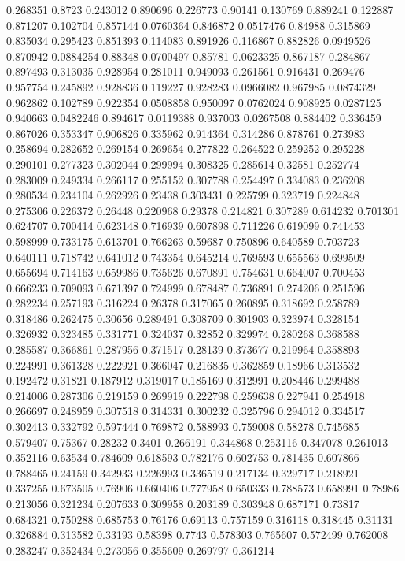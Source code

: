 0.268351 0.8723
0.243012 0.890696
0.226773 0.90141
0.130769 0.889241
0.122887 0.871207
0.102704 0.857144
0.0760364 0.846872
0.0517476 0.84988
0.315869 0.835034
0.295423 0.851393
0.114083 0.891926
0.116867 0.882826
0.0949526 0.870942
0.0884254 0.88348
0.0700497 0.85781
0.0623325 0.867187
0.284867 0.897493
0.313035 0.928954
0.281011 0.949093
0.261561 0.916431
0.269476 0.957754
0.245892 0.928836
0.119227 0.928283
0.0966082 0.967985
0.0874329 0.962862
0.102789 0.922354
0.0508858 0.950097
0.0762024 0.908925
0.0287125 0.940663
0.0482246 0.894617
0.0119388 0.937003
0.0267508 0.884402
0.336459 0.867026
0.353347 0.906826
0.335962 0.914364
0.314286 0.878761
0.273983 0.258694
0.282652 0.269154
0.269654 0.277822
0.264522 0.259252
0.295228 0.290101
0.277323 0.302044
0.299994 0.308325
0.285614 0.32581
0.252774 0.283009
0.249334 0.266117
0.255152 0.307788
0.254497 0.334083
0.236208 0.280534
0.234104 0.262926
0.23438 0.303431
0.225799 0.323719
0.224848 0.275306
0.226372 0.26448
0.220968 0.29378
0.214821 0.307289
0.614232 0.701301
0.624707 0.700414
0.623148 0.716939
0.607898 0.711226
0.619099 0.741453
0.598999 0.733175
0.613701 0.766263
0.59687 0.750896
0.640589 0.703723
0.640111 0.718742
0.641012 0.743354
0.645214 0.769593
0.655563 0.699509
0.655694 0.714163
0.659986 0.735626
0.670891 0.754631
0.664007 0.700453
0.666233 0.709093
0.671397 0.724999
0.678487 0.736891
0.274206 0.251596
0.282234 0.257193
0.316224 0.26378
0.317065 0.260895
0.318692 0.258789
0.318486 0.262475
0.30656 0.289491
0.308709 0.301903
0.323974 0.328154
0.326932 0.323485
0.331771 0.324037
0.32852 0.329974
0.280268 0.368588
0.285587 0.366861
0.287956 0.371517
0.28139 0.373677
0.219964 0.358893
0.224991 0.361328
0.222921 0.366047
0.216835 0.362859
0.18966 0.313532
0.192472 0.31821
0.187912 0.319017
0.185169 0.312991
0.208446 0.299488
0.214006 0.287306
0.219159 0.269919
0.222798 0.259638
0.227941 0.254918
0.266697 0.248959
0.307518 0.314331
0.300232 0.325796
0.294012 0.334517
0.302413 0.332792
0.597444 0.769872
0.588993 0.759008
0.58278 0.745685
0.579407 0.75367
0.28232 0.3401
0.266191 0.344868
0.253116 0.347078
0.261013 0.352116
0.63534 0.784609
0.618593 0.782176
0.602753 0.781435
0.607866 0.788465
0.24159 0.342933
0.226993 0.336519
0.217134 0.329717
0.218921 0.337255
0.673505 0.76906
0.660406 0.777958
0.650333 0.788573
0.658991 0.78986
0.213056 0.321234
0.207633 0.309958
0.203189 0.303948
0.687171 0.73817
0.684321 0.750288
0.685753 0.76176
0.69113 0.757159
0.316118 0.318445
0.31131 0.326884
0.313582 0.33193
0.58398 0.7743
0.578303 0.765607
0.572499 0.762008
0.283247 0.352434
0.273056 0.355609
0.269797 0.361214
